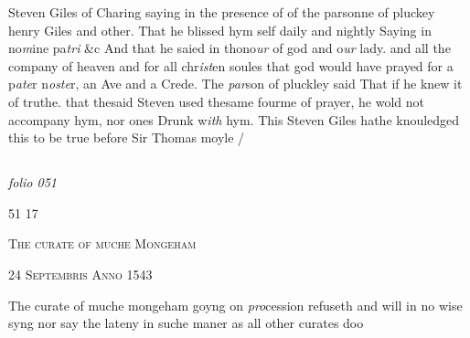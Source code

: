 \documentclass[12pt, a4paper]{book}
\begin{document}
 
		\ifthenelse{\isodd{\thepage}}
		{\reversemarginpar}
		{\normalmarginpar}
		Steven Giles of Charing saying in the presence of
 	of the parsonne of pluckey henry Giles and other. That
 he blissed hym self daily and nightly Saying in no\textit{m}ine pa\textit{tri}
 \&c And that he saied in thono\textit{ur} of god and o\textit{ur} lady.
 and all the company of heaven and for all chr\textit{ist}en soules
 that god would have prayed for a p\textit{ate}r n\textit{oste}r, an Ave
 	and a Crede. The \textit{par}son of pluckley said That
 if he knew it of truthe. that thesaid Steven used
 thesame fourme of prayer, he wold not accompany
 hym, nor ones Drunk w\textit{ith} hym. This Steven
 Giles hathe knouledged this to be true before
 	Sir Thomas moyle /


            
            
\dotfill
					  \subsection*{}

\textit{folio 051}


\begin{flushright}{\color{Mahogany}51} 17\end{flushright}
 

	
				\begin{center} \begin{large} {\scshape The curate of muche Mongeham} \end{large} \end{center}
			
	
		
				\begin{center}  {\scshape 24 Septembris Anno 1543}  \end{center}
			
		
			
				\marginpar[\vspace{0.5cm}{\textcolor{Gray}{The curate of moche mongeham}}]{}
			
			
		\ifthenelse{\isodd{\thepage}}
		{\reversemarginpar}
		{\normalmarginpar}
		The curate of muche mongeham goyng on \textit{pro}cession
				refuseth and will in no wise syng nor say the lateny
				in suche maner as all other curates doo
		
	
            
            
            	
\end{document}
